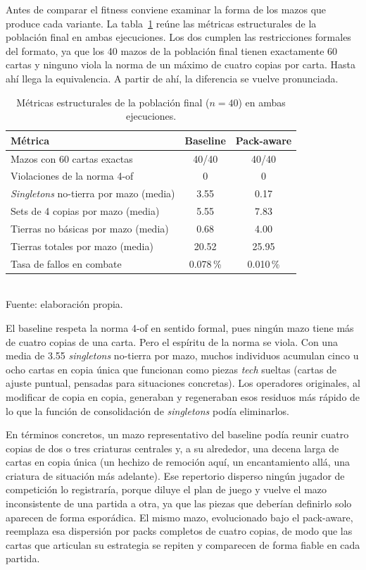 Antes de comparar el fitness conviene examinar la forma de los mazos que produce cada variante. La tabla~\ref{tab:estructura-ab} reúne las métricas estructurales de la población final en ambas ejecuciones. Los dos cumplen las restricciones formales del formato, ya que los 40 mazos de la población final tienen exactamente 60 cartas y ninguno viola la norma de un máximo de cuatro copias por carta. Hasta ahí llega la equivalencia. A partir de ahí, la diferencia se vuelve pronunciada.

\begin{table}[H]
\centering
\caption{Métricas estructurales de la población final ($n=40$) en ambas ejecuciones.}
\label{tab:estructura-ab}
\begin{tabular}{lcc}
\toprule
\textbf{Métrica} & \textbf{Baseline} & \textbf{Pack-aware} \\
\midrule
Mazos con 60 cartas exactas & 40/40 & 40/40 \\
Violaciones de la norma 4-of & 0 & 0 \\
\emph{Singletons} no-tierra por mazo (media) & 3.55 & 0.17 \\
Sets de 4 copias por mazo (media) & 5.55 & 7.83 \\
Tierras no básicas por mazo (media) & 0.68 & 4.00 \\
Tierras totales por mazo (media) & 20.52 & 25.95 \\
Tasa de fallos en combate & 0.078\,\% & 0.010\,\% \\
\bottomrule
\end{tabular}
\\[2pt]{\footnotesize Fuente: elaboración propia.}
\end{table}

El baseline respeta la norma 4-of en sentido formal, pues ningún mazo tiene más de cuatro copias de una carta. Pero el espíritu de la norma se viola. Con una media de 3.55 \emph{singletons} no-tierra por mazo, muchos individuos acumulan cinco u ocho cartas en copia única que funcionan como piezas \emph{tech} sueltas (cartas de ajuste puntual, pensadas para situaciones concretas). Los operadores originales, al modificar de copia en copia, generaban y regeneraban esos residuos más rápido de lo que la función de consolidación de \emph{singletons} podía eliminarlos.

En términos concretos, un mazo representativo del baseline podía reunir cuatro copias de dos o tres criaturas centrales y, a su alrededor, una decena larga de cartas en copia única (un hechizo de remoción aquí, un encantamiento allá, una criatura de situación más adelante). Ese repertorio disperso ningún jugador de competición lo registraría, porque diluye el plan de juego y vuelve el mazo inconsistente de una partida a otra, ya que las piezas que deberían definirlo solo aparecen de forma esporádica. El mismo mazo, evolucionado bajo el pack-aware, reemplaza esa dispersión por packs completos de cuatro copias, de modo que las cartas que articulan su estrategia se repiten y comparecen de forma fiable en cada partida.

